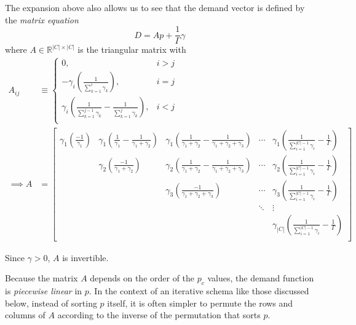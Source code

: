 \documentclass[12pt]{article}
\theoremstyle{definition}
\begin{document}
The expansion above also allows us to see that the demand vector is defined by the \emph{matrix equation}
\begin{equation}D = A p + \frac{1}{\Gamma}\gamma \label{demandmatrixeq}\end{equation}
where $A\in \mathbb{R}^{|C| \times |C|}$ is the triangular matrix with
\begin{align} \label{Adef}
A_{ij} &\equiv \begin{cases}
0, & i > j \\
-\gamma_i \left(\frac{1}{ \sum_{k=1}^i \gamma_k}\right), & i=j \\
\gamma_i \left( \frac{1}{\sum_{k=1}^{j-1} \gamma_k} -  \frac{1}{\sum_{k=1}^{j} \gamma_k}\right), & i<j \\
\end{cases} \\[.8em]
\implies A &= \begin{bmatrix}
\gamma_1 \left( \frac{-1}{\gamma_1} \right) & \gamma_1 \left(\frac{1}{\gamma_1} - \frac{1}{\gamma_1 + \gamma_2} \right) & \gamma_1 \left(\frac{1}{\gamma_1 + \gamma_2} - \frac{1}{\gamma_1 + \gamma_2 + \gamma_3} \right) & \cdots &  \gamma_1 \left(\frac{1}{\sum_{i=1}^{|C| - 1}\gamma_i} - \frac{1}{\Gamma}  \right)  \\
 & \gamma_2 \left( \frac{-1}{\gamma_1 + \gamma_2} \right) & \gamma_2 \left(\frac{1}{\gamma_1 + \gamma_2} - \frac{1}{\gamma_1 + \gamma_2 + \gamma_3} \right) & \cdots &  \gamma_2 \left(\frac{1}{\sum_{i=1}^{|C| - 1}\gamma_i} - \frac{1}{\Gamma} \right)  \\
 &  & \gamma_3 \left( \frac{-1}{\gamma_1 + \gamma_2 + \gamma_3} \right) & \cdots &  \gamma_3 \left(\frac{1}{\sum_{i=1}^{|C| - 1}\gamma_i} - \frac{1}{\Gamma} \right)  \\
 & & & \ddots & \vdots \\
 &  &  &  &  \gamma_{|C|} \left(\frac{1}{\sum_{i=1}^{|C| - 1}\gamma_i} -\frac{1}{\Gamma}  \right)  \\
\end{bmatrix}\end{align}

Since $\gamma > 0$, $A$ is invertible. 

Because the matrix $A$ depends on the order of the $p_c$ values, the demand function is \emph{piecewise linear} in $p$. In the context of an iterative schema like those discussed below, instead of sorting $p$ itself, it is often simpler to permute the rows and columns of $A$ according to the inverse of the permutation that sorts $p$. 
\end{document}
